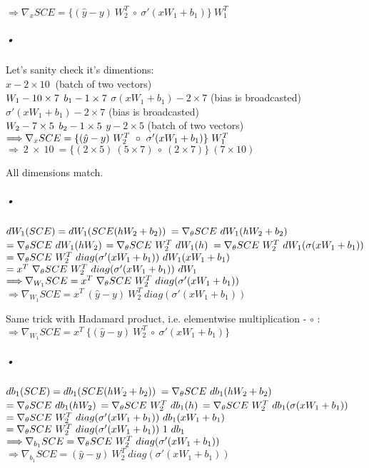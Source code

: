 \documentclass{article}
\begin{document}
$\Longrightarrow \nabla_x SCE = \{ (\hat{y}-y) \ W_2^T \ \circ\ \sigma' (xW_1+b_1)\} \ W_1^T$

\subparagraph{•}
Let's sanity check it's dimentions:\\
$x - 2 \times 10 \ $ (batch of two vectors)\\
$W_1 - 10 \times 7 \\$
$b_1 - 1 \times 7 \\$
$\sigma(xW_1+b_1) - 2 \times 7 $ (bias is broadcasted)\\
$\sigma'(xW_1+b_1) - 2 \times 7 $ (bias is broadcasted)\\
$W_2 - 7 \times 5 \\$
$b_2 - 1 \times 5 \\$
$y - 2 \times 5 $ (batch of two vectors)\\

$\Longrightarrow \nabla_x SCE = \{ (\hat{y}-y) \ W_2^T \ \circ\ \sigma' (xW_1+b_1)\} \ W_1^T\\$
$\Longrightarrow \ 2 \ \times \ 10 \  = \{ (2 \times 5) \ (5 \times 7) \ \circ\ (2 \times 7)\} \ (7 \times 10)$

All dimensions match.

\subparagraph{•}
$dW_1(SCE)=dW_1(SCE(hW_2+b_2)) \\$
$= \nabla_\theta SCE \ dW_1(hW_2+b_2) \\$
$= \nabla_\theta SCE \ dW_1(hW_2) \\$
$= \nabla_\theta SCE \ W_2^T \ dW_1(h) \\$
$= \nabla_\theta SCE \ W_2^T \ dW_1(\sigma (xW_1+b_1)) \\$
$= \nabla_\theta SCE \ W_2^T \ diag(\sigma' (xW_1+b_1)) \ dW_1(xW_1+b_1) \\$
$= x^T \ \nabla_\theta SCE \ W_2^T \ diag(\sigma' (xW_1+b_1)) \ dW_1 \\$
$\Longrightarrow \nabla_{W_1} SCE = x^T \ \nabla_\theta SCE \ W_2^T \ diag(\sigma' (xW_1+b_1)) \\$
$\Longrightarrow \nabla_{W_1} SCE = x^T \ (\hat{y}-y) \ W_2^T \ diag(\sigma' (xW_1+b_1))$

Same trick with Hadamard product, i.e. elementwise multiplication - $\circ$ :\\
$\Longrightarrow \nabla_{W_1} SCE = x^T \ \{ (\hat{y}-y) \ W_2^T \ \circ \ \sigma' (xW_1+b_1) \}$

\subparagraph{•}
$db_1(SCE)=db_1(SCE(hW_2+b_2)) \\$
$= \nabla_\theta SCE \ db_1(hW_2+b_2) \\$
$= \nabla_\theta SCE \ db_1(hW_2) \\$
$= \nabla_\theta SCE \ W_2^T \ db_1(h) \\$
$= \nabla_\theta SCE \ W_2^T \ db_1(\sigma (xW_1+b_1)) \\$
$= \nabla_\theta SCE \ W_2^T \ diag(\sigma' (xW_1+b_1)) \ db_1(xW_1+b_1) \\$
$= \nabla_\theta SCE \ W_2^T \ diag(\sigma' (xW_1+b_1)) \ 1 \ db_1 \\$
$\Longrightarrow \nabla_{b_1} SCE = \nabla_\theta SCE \ W_2^T \ diag(\sigma' (xW_1+b_1)) \\$
$\Longrightarrow \nabla_{b_1} SCE = (\hat{y}-y) \ W_2^T \ diag(\sigma' (xW_1+b_1))$
\end{document}
